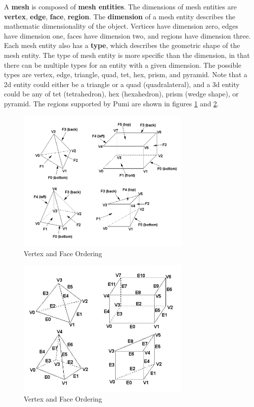 \documentclass[12pt]{article}
\begin{document}
A \textbf{mesh} is composed of \textbf{mesh entities}.  The dimensions of mesh entities are \textbf{vertex}, \textbf{edge}, \textbf{face}, \textbf{region}.  The \textbf{dimension} of a mesh entity describes the mathematic dimensionality of the object.  Vertices have dimension zero, edges have dimension one, faces have dimension two, and regions have dimension three. Each mesh entity also has a \textbf{type}, which describes the geometric shape of the mesh entity.   The type of mesh entity is more specific than the dimension, in that there can be multiple types for an entity with a given dimension.  The possible types are vertex, edge, triangle, quad, tet, hex, prism, and pyramid.  Note that a 2d entity could either be a triangle or a quad (quadralateral), and a 3d entity could be any of tet (tetrahedron), hex (hexahedron), prism (wedge shape), or pyramid.  The regions supported by Pumi are shown in figures \ref{fig:vert_ordering} and \ref{fig:edge_ordering}.


\begin{figure}
\centering
\includegraphics[width=0.75\textwidth]{region_faces.jpg}
\caption{\label{fig:vert_ordering} Vertex and Face Ordering  }
\end{figure}

\begin{figure}
\centering
\includegraphics[width=0.75\textwidth]{region_edges.jpg}
\caption{\label{fig:edge_ordering} Vertex and Face Ordering  }
\end{figure}
\end{document}
